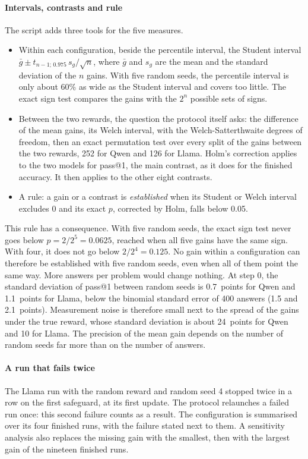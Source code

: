 \paragraph{Intervals, contrasts and rule} The script  adds three tools for the
five measures.
\begin{itemize}
  \item Within each configuration, beside the percentile interval, the Student interval
    $\bar g \pm t_{n-1;\,0.975}\, s_g/\sqrt n$, where $\bar g$ and $s_g$ are the mean and the standard
    deviation of the $n$ gains. With five random seeds, the percentile interval is only about 60\% as wide
    as the Student interval and covers too little. The exact sign test compares the gains with the $2^n$
    possible sets of signs.
  \item Between the two rewards, the question the protocol itself asks: the difference of the mean gains,
    its Welch interval, with the Welch-Satterthwaite degrees of freedom, then an exact permutation test over
    every split of the gains between the two rewards, 252 for Qwen and 126 for Llama. Holm's correction
    applies to the two models for pass@1, the main contrast, as it does for the finished accuracy. It then
    applies to the other eight contrasts.
  \item A rule: a gain or a contrast is \emph{established} when its Student or Welch interval excludes 0
    and its exact $p$, corrected by Holm, falls below 0.05.
\end{itemize}
This rule has a consequence. With five random seeds, the exact sign test never
goes below $p = 2/2^5 = 0.0625$, reached when all five gains have the same sign. With four, it does not go
below $2/2^4 = 0.125$. No gain within a configuration can therefore be established with five random seeds,
even when all of them point the same way. More answers per problem would change nothing. At step 0, the
standard deviation of pass@1 between random seeds is 0.7~points for Qwen and 1.1~points for Llama, below
the binomial standard error of 400 answers (1.5 and 2.1~points). Measurement noise is therefore small next
to the spread of the gains under the true reward, whose standard deviation is about 24~points for Qwen and
10 for Llama. The precision of the mean gain depends on the number of random seeds far more than on the
number of answers.

\paragraph{A run that fails twice} The Llama run with the random reward and random seed 4 stopped
twice in a row on the first safeguard, at its first update. The protocol relaunches a failed run
once: this second failure counts as a result. The configuration is summarised over its four finished runs, with the failure
stated next to them. A sensitivity analysis also replaces the missing gain with the smallest, then
with the largest gain of the nineteen finished runs.

